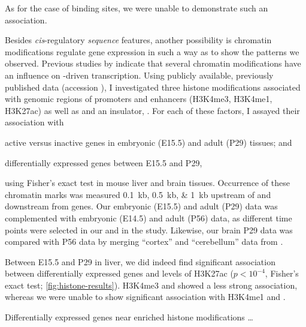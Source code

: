 As for the case of \tf binding sites, we were
unable to demonstrate such an association.

Besides \emph{cis}-regulatory \emph{sequence} features, another possibility is
chromatin modifications regulate \trna gene expression in such a way as to show
the patterns we observed. Previous studies by \citet{Barski:2010,Oler:2010}
indicate that several chromatin modifications have an influence on -driven
transcription. Using publicly available, previously published data
\citep{Shen:2012} (\geo accession ), I investigated three
histone modifications associated with genomic regions of promoters and enhancers
(H3K4me3, H3K4me1, H3K27ac) as well as  and an insulator, \ctcf. For each
of these factors, I assayed their association with

\begin{shortenumerate}
    \item active versus inactive \trna genes in embryonic (E15.5) and adult
        (P29) tissues; and
    \item differentially expressed \trna genes between E15.5 and P29,
\end{shortenumerate}

using Fisher’s exact test in mouse liver and brain tissues. Occurrence of these
chromatin marks was measured \SIlist{0.1;0.5;1}{kb} upstream of and downstream
from \trna genes. Our embryonic (E15.5) and adult (P29)  data was
complemented with embryonic (E14.5) and adult (P56) \chipseq data, as different
time points were selected in our and in the \citet{Shen:2012} study. Likewise,
our brain P29 data was compared with P56 data by merging “cortex” and
“cerebellum” \chipseq data from \citet{Shen:2012}.

Between E15.5 and P29 in liver, we did indeed find significant association
between differentially expressed \trna genes and levels of H3K27ac (\(p <
10^{-4}\), Fisher’s exact test; \cref{fig:histone-results}). H3K4me3 and 
showed a less strong association, whereas we were unable to show significant
association with H3K4me1 and \ctcf.

    {Differentially expressed \trna genes near enriched histone modifications}
    {…}

